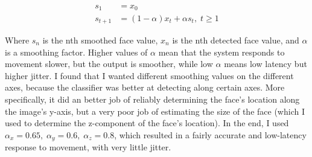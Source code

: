 \documentclass[letterpaper]{article}
\begin{document}
\begin{align*}
  s_1 &= x_0 \\
  s_{t+1} &= (1 - \alpha) x_t + \alpha s_t, \; t \ge 1
\end{align*}

Where $s_n$ is the nth smoothed face value, $x_n$ is the nth detected
face value, and $\alpha$ is a smoothing factor. Higher values of
$\alpha$ mean that the system responds to movement slower, but the
output is smoother, while low $\alpha$ means low latency but higher
jitter. I found that I wanted different smoothing values on the
different axes, because the classifier was better at detecting along
certain axes. More specifically, it did an better job of reliably
determining the face's location along the image's y-axis, but a very
poor job of estimating the size of the face (which I used to determine
the z-component of the face's location). In the end, I used $\alpha_x
= 0.65, \; \alpha_y = 0.6, \; \alpha_z = 0.8$, which resulted in a
fairly accurate and low-latency response to movement, with very little
jitter.
\end{document}
